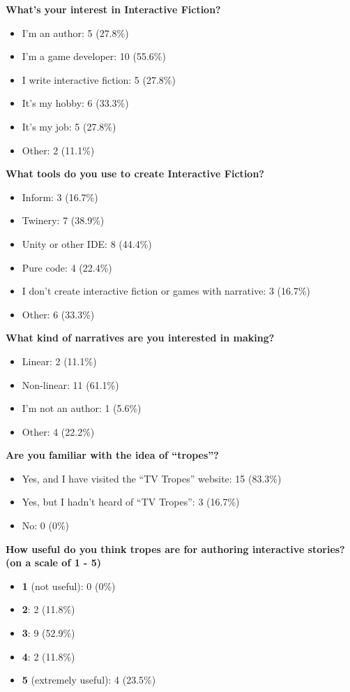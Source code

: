 \documentclass[11pt]{report}
\begin{document}
\textbf{What's your interest in Interactive Fiction?}
\begin{itemize}
  \item I'm an author: 5 (27.8\%)
  \item I'm a game developer: 10 (55.6\%)
  \item I write interactive fiction: 5 (27.8\%)
  \item It's my hobby: 6 (33.3\%)
  \item It's my job: 5 (27.8\%)
  \item Other: 2 (11.1\%)
\end{itemize}
\textbf{What tools do you use to create Interactive Fiction?}
\begin{itemize}
  \item Inform: 3 (16.7\%)
  \item Twinery: 7 (38.9\%)
  \item Unity or other IDE: 8 (44.4\%)
  \item Pure code: 4 (22.4\%)
  \item I don't create interactive fiction or games with narrative: 3 (16.7\%)
  \item Other: 6 (33.3\%)
\end{itemize}
\textbf{What kind of narratives are you interested in making?}
\begin{itemize}
  \item Linear: 2 (11.1\%)
  \item Non-linear: 11 (61.1\%)
  \item I'm not an author: 1 (5.6\%)
  \item Other: 4 (22.2\%)
\end{itemize}
\textbf{Are you familiar with the idea of ``tropes''?}
\begin{itemize}
  \item Yes, and I have visited the ``TV Tropes'' website: 15 (83.3\%)
  \item Yes, but I hadn't heard of ``TV Tropes'': 3 (16.7\%)
  \item No: 0 (0\%)
\end{itemize}
\textbf{How useful do you think tropes are for authoring interactive stories?
  (on a scale of 1 - 5)}
\begin{itemize}
  \item \textbf{1} (not useful): 0 (0\%)
  \item \textbf{2}: 2 (11.8\%)
  \item \textbf{3}: 9 (52.9\%)
  \item \textbf{4}: 2 (11.8\%)
  \item \textbf{5} (extremely useful): 4 (23.5\%)
\end{itemize}
\end{document}
